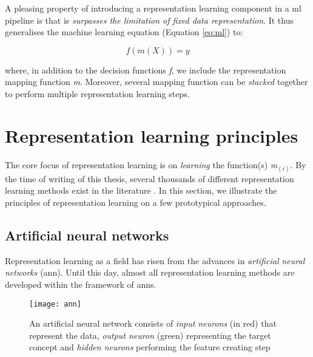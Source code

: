 A pleasing property of introducing a representation learning component in a \gls{ml} pipeline is that is \textit{surpasses the limitation of fixed data representation}.
It thus generalises the machine learning equation (Equation \ref{eq:ml}) to:

\begin{equation}
	f(m(X)) = y
\end{equation}


where, in addition to the decision functions \textit{f}, we include the representation mapping function \textit{m}.
Moreover, several mapping function can be \textit{stacked} together to perform multiple representation learning steps.







\section{Representation learning principles}


The core focus of representation learning is on \textit{learning} the function(s) \textit{m}$_{(i)}$.
By the time of writing of this thesis, several thousands of different representation learning methods exist in the literature \cite{Goodfellow2016}.
In this section, we illustrate the principles of representation learning on a few prototypical approaches.


\subsection{Artificial neural networks}



Representation learning as a field has risen from the advances in \textit{artificial neural networks} (\gls{ann}).
Until this day, almost all representation learning methods are developed within the framework of \gls{ann}s.

\begin{figure}
	\centering
	\texttt{[image: ann]}
	\caption[Illustration of an artificial neural networks]{An artificial neural network consists of \textit{input neurons} (in red) that represent the data, \textit{output neuron} (green) representing the target concept and \textit{hidden neurons} performing the feature creating step}
	\label{fig:ann}
\end{figure}


